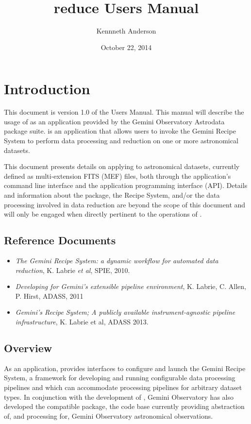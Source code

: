 \documentclass[letterpaper,10pt,english]{sphinxmanual}
\title{reduce Users Manual}
\date{October 22, 2014}
\author{Kennneth Anderson}
\begin{document}
\maketitle
\tableofcontents
{}\label{index-latex::doc}



\chapter{Introduction}
\label{intro:introduction}\label{intro:reduce-users-manual}\label{intro::doc}
This document is version 1.0 of the  Users Manual. This manual will
describe the usage of  as an application provided by the Gemini Observatory
Astrodata package suite.  is an application that allows users to invoke the
Gemini Recipe System to perform data processing and reduction on one or more
astronomical datasets.

This document presents details on applying  to astronomical datasets,
currently defined as multi-extension FITS (MEF) files, both through the application's
command line interface and the application programming interface (API). Details and
information about the  package, the Recipe System, and/or the data
processing involved in data reduction are beyond the scope of this document and
will only be engaged when directly pertinent to the operations of .


\section{Reference Documents}
\label{intro:reference-documents}\begin{itemize}
\item {} 
\emph{The Gemini Recipe System: a dynamic workflow for automated data reduction},
K. Labrie \emph{et al}, SPIE, 2010.

\item {} 
\emph{Developing for Gemini’s extensible pipeline environment}, K. Labrie,
C. Allen, P. Hirst, ADASS, 2011

\item {} 
\emph{Gemini's Recipe System; A publicly available instrument-agnostic pipeline
infrastructure}, K. Labrie et al, ADASS 2013.

\end{itemize}


\section{Overview}
\label{intro:overview}
As an application,  provides interfaces to configure and launch the
Gemini Recipe System, a framework for developing and running configurable data
processing pipelines and which can accommodate processing pipelines for arbitrary
dataset types. In conjunction with the development of , Gemini
Observatory has also developed the compatible  package, the
code base currently providing abstraction of, and processing for, Gemini
Observatory astronomical observations.
\end{document}
